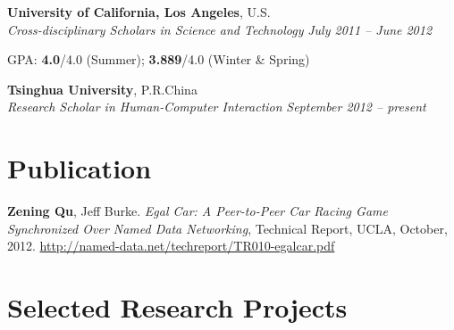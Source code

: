 \documentclass[margin,line]{resume}
\begin{document}
\begin{resume}
    \textbf{University of California, Los Angeles}, U.S. \vspace{2mm}\\\vspace{1mm}%
    \textsl{Cross-disciplinary Scholars in Science and Technology} \hfill \textsl{July 2011 -- June 2012} \vspace{-3mm}\\\vspace{-1mm}%
    \begin{list2}
        \item GPA: \textbf{4.0}/4.0 (Summer); \textbf{3.889}/4.0 (Winter \& Spring)
    \end{list2}\vspace{-1.5mm}

     \textbf{Tsinghua University}, P.R.China \vspace{2mm}\\\vspace{1mm}%
    \textsl{Research Scholar in Human-Computer Interaction} \hfill \textsl{September 2012 -- present}\vspace{-3mm}\\\vspace{-1mm}%
    
    \section{\mysidestyle Publication}

    \textbf{Zening Qu}, Jeff Burke. \emph{Egal Car: A Peer-to-Peer Car Racing Game Synchronized Over Named Data Networking}, Technical Report, UCLA, October, 2012. \href{http://named-data.net/techreport/TR010-egalcar.pdf}{\url{http://named-data.net/techreport/TR010-egalcar.pdf}}


    \section{\mysidestyle Selected Research Projects}


\end{resume}
\end{document}
